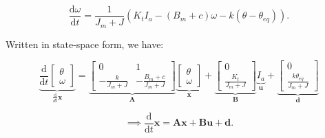 \begin{equation}
    \frac{\mathrm{d}\omega}{\mathrm{d}t} = \frac{1}{J_m + J} \left(K_t I_a - (B_m + c) \omega - k (\theta - \theta_{eq})\right).
\end{equation}

Written in state-space form, we have:

\begin{equation}
    \label{eq:state_space_model}
    \underbrace{
    \frac{\mathrm{d}}{\mathrm{d}t}
    \begin{bmatrix}
        \theta\\
        \omega
    \end{bmatrix}}_{\textstyle \frac{\mathrm{d}}{dt}\mathbf{x}} =
    \underbrace{
    \begin{bmatrix}
        0 & 1 \\
        -\frac{k}{J_m + J} & -\frac{B_m + c}{J_m + J}
    \end{bmatrix}}_{\textstyle \mathbf{A}}
    \underbrace{
    \begin{bmatrix}
        \theta\\
        \omega
    \end{bmatrix}}_{\textstyle \mathbf{x}} +
    \underbrace{
    \begin{bmatrix}
        0\\
        \frac{K_t}{J_m + J}
    \end{bmatrix}}_{\textstyle \mathbf{B}} \underbrace{I_a}_{\textstyle \mathbf{u}} + 
    \underbrace{
    \begin{bmatrix}
        0\\
        \frac{k \theta_{eq}}{J_m + J}
    \end{bmatrix}}_{\textstyle \mathbf{d}}
\end{equation}

\begin{equation*}
    \implies \frac{\mathrm{d}}{\mathrm{d}t}\mathbf{x} = \mathbf{A}\mathbf{x} + \mathbf{B}\mathbf{u} + \mathbf{d}.
\end{equation*}




